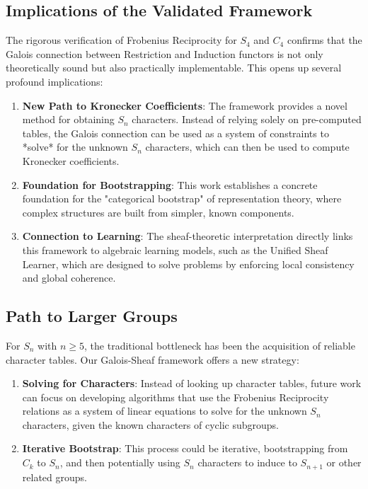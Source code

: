 \documentclass[11pt]{article}
\theoremstyle{definition}
\theoremstyle{remark}
\begin{document}
\subsection{Implications of the Validated Framework}
The rigorous verification of Frobenius Reciprocity for $S_4$ and $C_4$ confirms that the Galois connection between Restriction and Induction functors is not only theoretically sound but also practically implementable. This opens up several profound implications:
\begin{enumerate}
    \item \textbf{New Path to Kronecker Coefficients}: The framework provides a novel method for obtaining $S_n$ characters. Instead of relying solely on pre-computed tables, the Galois connection can be used as a system of constraints to *solve* for the unknown $S_n$ characters, which can then be used to compute Kronecker coefficients.
    \item \textbf{Foundation for Bootstrapping}: This work establishes a concrete foundation for the "categorical bootstrap" of representation theory, where complex structures are built from simpler, known components.
    \item \textbf{Connection to Learning}: The sheaf-theoretic interpretation directly links this framework to algebraic learning models, such as the Unified Sheaf Learner, which are designed to solve problems by enforcing local consistency and global coherence.
\end{enumerate}

\subsection{Path to Larger Groups}
For $S_n$ with $n \geq 5$, the traditional bottleneck has been the acquisition of reliable character tables. Our Galois-Sheaf framework offers a new strategy:
\begin{enumerate}
    \item \textbf{Solving for Characters}: Instead of looking up character tables, future work can focus on developing algorithms that use the Frobenius Reciprocity relations as a system of linear equations to solve for the unknown $S_n$ characters, given the known characters of cyclic subgroups.
    \item \textbf{Iterative Bootstrap}: This process could be iterative, bootstrapping from $C_k$ to $S_n$, and then potentially using $S_n$ characters to induce to $S_{n+1}$ or other related groups.
\end{enumerate}
\end{document}

